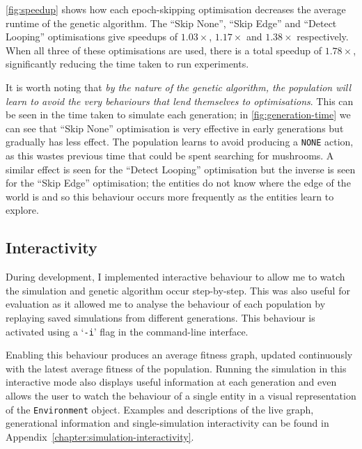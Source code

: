 \documentclass[12pt,a4paper]{report}
\begin{document}
\cref{fig:speedup} shows how each epoch-skipping optimisation decreases the average runtime of the genetic algorithm. The ``Skip None'', ``Skip Edge'' and ``Detect Looping'' optimisations give speedups of $1.03\times$, $1.17\times$ and $1.38\times$ respectively. When all three of these optimisations are used, there is a total speedup of $1.78\times$, significantly reducing the time taken to run experiments.


It is worth noting that \emph{by the nature of the genetic algorithm, the population will learn to avoid the very behaviours that lend themselves to optimisations}. This can be seen in the time taken to simulate each generation; in \cref{fig:generation-time} we can see that ``Skip None'' optimisation is very effective in early generations but gradually has less effect. The population learns to avoid producing a \texttt{NONE} action, as this wastes previous time that could be spent searching for mushrooms. A similar effect is seen for the ``Detect Looping'' optimisation but the inverse is seen for the ``Skip Edge'' optimisation; the entities do not know where the edge of the world is and so this behaviour occurs more frequently as the entities learn to explore.

\subsection{Interactivity}\label{section:interactivity}

During development, I implemented interactive behaviour to allow me to watch the simulation and genetic algorithm occur step-by-step. This was also useful for evaluation as it allowed me to analyse the behaviour of each population by replaying saved simulations from different generations. This behaviour is activated using a `\texttt{-i}' flag in the command-line interface.

Enabling this behaviour produces an average fitness graph, updated continuously with the latest average fitness of the population. Running the simulation in this interactive mode also displays useful information at each generation and even allows the user to watch the behaviour of a single entity in a visual representation of the \texttt{Environment} object. Examples and descriptions of the live graph, generational information and single-simulation interactivity can be found in Appendix~\ref{chapter:simulation-interactivity}.
\end{document}
